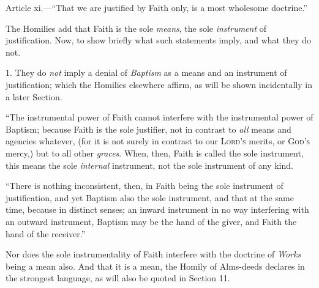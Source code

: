 
Article xi.—``That we are justified by Faith only, is a most
wholesome doctrine.''

The Homilies add that Faith is the sole \emph{means}, the sole \emph{instrument}
of justification. Now, to show briefly what such statements imply, and
what they do not.

1. They do \emph{not} imply a denial of \emph{Baptism} as a means
and an instrument of justification; which the Homilies elsewhere
affirm, as will be shown incidentally in a later Section.

``The instrumental power of Faith cannot interfere with the
instrumental power of Baptism; because Faith is the sole justifier,
not in contrast to \emph{all} means and agencies whatever, (for it is
not surely in contrast to our L\textsc{ord's} merits, or
G\textsc{od's} mercy,) but to all other \emph{graces}.
When, then, Faith is called the sole instrument, this means the sole \emph{internal}
instrument, not the sole instrument of any kind.

``There is nothing inconsistent, then, in Faith being the sole
instrument of justification, and yet Baptism also the sole instrument,
and that at the same time, because in distinct senses; an inward
instrument in no way interfering with an outward instrument, Baptism
may be the hand of the giver, and Faith the hand of the
receiver.''

Nor does the sole instrumentality of Faith interfere with the
doctrine of \emph{Works} being a mean also. And that it is a mean, the
Homily of Alms-deeds declares in the strongest language, as will also
be quoted in Section 11.

